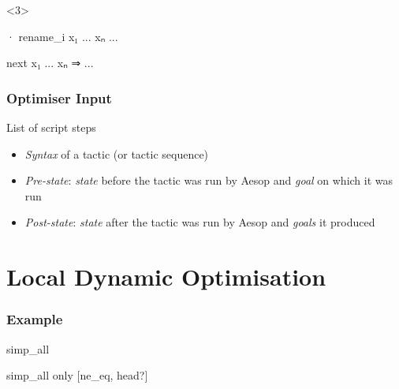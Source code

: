 \begin{frame}[fragile,t]
\begin{enumerate}[<+->]
          \begin{onlyenv}<3>
            \begin{minipage}{.4\textwidth}
              \begin{leancode}
                · rename_i x₁ ... xₙ
                  ...
              \end{leancode}
            \end{minipage}
            \Longrightarrow
            \begin{minipage}{.4\textwidth}
              \begin{leancode}
                next x₁ ... xₙ ⇒ ...
              \end{leancode}
            \end{minipage}
          \end{onlyenv}
  \end{enumerate}
\end{frame}

\begin{frame}
  \frametitle{Optimiser Input}

  \begin{definition}
    List of script steps
  \end{definition}

  \begin{definition}
    \begin{itemize}
      \item \emph{Syntax} of a tactic (or tactic sequence)
      \item \emph{Pre-state}: \emph{state} before the tactic was run by Aesop and \emph{goal} on which it was run
      \item \emph{Post-state}: \emph{state} after the tactic was run by Aesop and \emph{goals} it produced
    \end{itemize}
  \end{definition}
\end{frame}

\section{Local Dynamic Optimisation}

\begin{frame}[fragile]
  \frametitle{Example}

  \begin{minipage}{.2\textwidth}
    \begin{leancode}
      simp_all
    \end{leancode}
  \end{minipage}
  \Longrightarrow
  \begin{minipage}{.5\textwidth}
    \begin{leancode}
      simp_all only [ne_eq, head?]
    \end{leancode}
  \end{minipage}
\end{frame}

